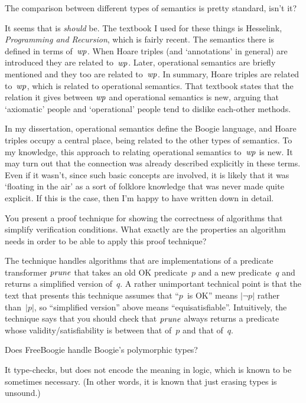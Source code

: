 \Q The comparison between different types of semantics is pretty standard,
isn't it?

\A It seems that is {\it should\/} be. The textbook I used for these things
is Hesselink, {\sl Programming and Recursion}, which is fairly recent. The
semantics there is defined in terms of~${\it wp}$. When Hoare triples (and
`annotations' in general) are introduced they are related to~${\it wp}$.
Later, operational semantics are briefly mentioned and they too are related
to~${\it wp}$. In summary, Hoare triples are related to~${\it wp}$, which
is related to operational semantics. That textbook states that the relation
it gives between ${\it wp}$ and operational semantics is new, arguing that
`axiomatic' people and `operational' people tend to dislike each-other
methods.

In my dissertation, operational semantics define the Boogie language, and
Hoare triples occupy a central place, being related to the other types of
semantics. To my knowledge, this approach to relating operational semantics
to~${\it wp}$ is new. It may turn out that the connection was already
described explicitly in these terms. Even if it wasn't, since such basic
concepts are involved, it is likely that it was `floating in the air' as a
sort of folklore knowledge that was never made quite explicit. If this is
the case, then I'm happy to have written down in detail.

\Q You present a proof technique for showing the correctness of algorithms
that simplify verification conditions. What exactly are the properties an
algorithm needs in order to be able to apply this proof technique?

\A The technique handles algorithms that are implementations of a predicate
transformer ${\it prune}$ that takes an old OK predicate~$p$ and a new
predicate~$q$ and returns a simplified version of~$q$. A rather unimportant
technical point is that the text that presents this technique assumes that
``$p$~is OK'' means $|\lnot p|$ rather than~$|p|$, so ``simplified
version'' above means ``equisatisfiable''. Intuitively, the technique says
that you should check that ${\it prune}$ always returns a predicate whose
validity/satisfiability is between that of~$p$ and that of~$q$.

\Q Does FreeBoogie handle Boogie's polymorphic types?

\A It type-checks, but does not encode the meaning in logic, which is known
to be sometimes necessary. (In other words, it is known that just erasing
types is unsound.)

